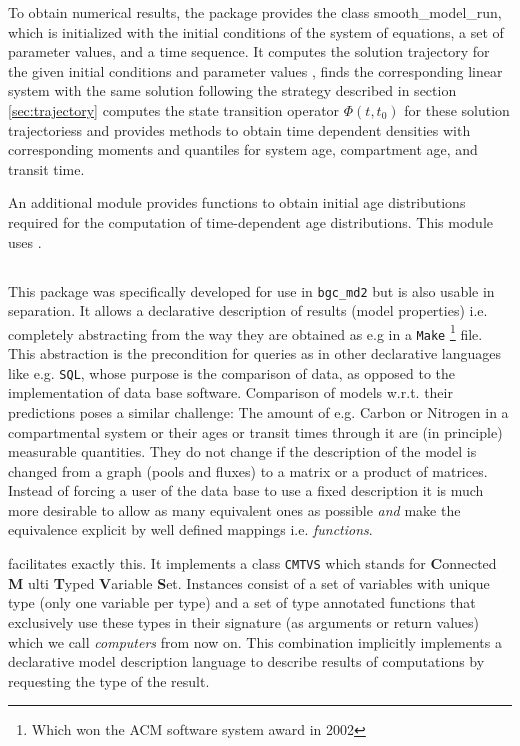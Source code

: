 To obtain numerical results, the package
provides the class smooth\_model\_run, which is initialized with the initial
conditions of the system of equations, a set of parameter values, and a time
sequence. It computes the solution trajectory for the given initial conditions and
parameter values , finds the corresponding linear system with the same solution
following the strategy described in section \ref{sec:trajectory} computes the
state transition operator $\Phi(t, t_0)$ for these solution trajectoriess and 
provides methods to obtain time dependent densities with corresponding moments and quantiles for system age, compartment age, and transit time. 

An additional module provides functions to obtain initial age distributions
required for the computation of time-dependent age distributions. 
This module uses \LAPM.

\subsection{\ComputabilityGraphs}
This package was specifically developed for use in \texttt{bgc\_md2} but is also usable in separation.
It allows a declarative description of results (model properties) i.e. completely abstracting from the way they are obtained as e.g in a \texttt{Make} 
\footnote{Which won the ACM software system award in 2002} file.  This
abstraction is the precondition for queries as in other declarative languages
like e.g. \texttt{SQL}, whose purpose is the comparison of data, as opposed to
the implementation of data base software.  Comparison of models w.r.t. their
predictions poses a similar challenge: The amount of e.g. Carbon or Nitrogen in
a compartmental system or their ages or transit times through it are (in
principle) measurable quantities. They do not change if the description of the
model is changed from a graph (pools and fluxes) to a matrix or a product of matrices.
Instead of forcing a user of the data base to use a fixed
description it is much more desirable to allow as many equivalent ones as
possible \emph{and} make the equivalence explicit by  well defined mappings i.e. \emph{functions}.

\ComputabilityGraphs facilitates exactly this.
It implements a class \texttt{CMTVS} which stands for 
{\bf C}onnected {\bf M} ulti {\bf T}yped {\bf V}ariable {\bf S}et. 
Instances consist of a set of variables with unique type (only one variable per type) and a set of type annotated functions that exclusively 
use these types in their signature (as arguments or return values) which we call \emph{computers} from now on.
This combination implicitly implements a declarative model description language to describe results of computations by requesting the type of the result. 


